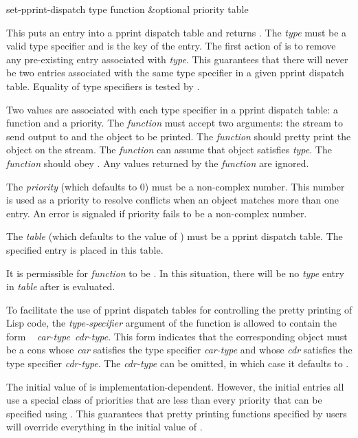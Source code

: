 \begin{defun}[Function]
set-pprint-dispatch type function &optional priority table 

This puts an entry into a pprint dispatch table and returns .  The {\it
type} must be a valid type specifier and is the key of the entry.
The first action of  is to remove any pre-existing
entry associated with \emph{type}.  This guarantees that there
will never be two entries associated with the same type specifier in a
given pprint dispatch table.  Equality of type specifiers is tested by
.

Two values are associated with each type specifier in a pprint dispatch
table: a function and a priority.  The \emph{function} must accept two
arguments:  the stream to send output to and the object to be printed.
The \emph{function} should pretty print the object on the stream.  The {\it
function} can assume that object satisfies \emph{type}.  The \emph{function}
should obey .  Any values returned by the \emph{function}
are ignored.

The \emph{priority} (which defaults to 0) must be a non-complex number.
This number is used as a
priority to resolve conflicts when an object matches more than one entry.  An error
is signaled if priority fails to be a non-complex number.

The \emph{table} (which defaults to the value of ) must be a pprint
dispatch table.  The specified entry is placed in this table.

It is permissible for \emph{function} to be .  In this situation,
there will be no \emph{type} entry in \emph{table} after
 is evaluated.

To facilitate the use of pprint dispatch tables for controlling the pretty
printing of Lisp code, the \emph{type-specifier} argument of the function
 is allowed to contain the form ~{\it
car-type~cdr-type}\cd{)}.  This form indicates that the corresponding object must be
a cons whose \emph{car} satisfies the type specifier \emph{car-type} and whose
\emph{cdr} satisfies
the type specifier \emph{cdr-type}.  The \emph{cdr-type} can be omitted, in which case
it defaults to .
\end{defun}

The initial value of  is implementation-dependent.
However, the initial entries all use a special class of priorities that
are less than every priority that can be
specified using .  This guarantees that pretty printing
functions specified by users will override everything in the initial value of
.

